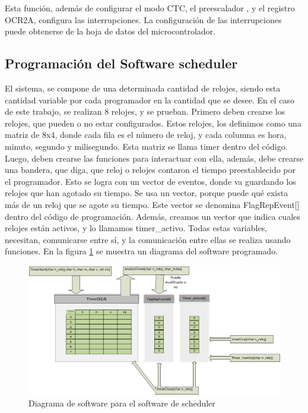 Esta función, además de configurar el modo CTC, el preescalador , y el registro OCR2A, configura las interrupciones. La configuración de las interrupciones puede obtenerse de la hoja de datos del microcontrolador.

\subsection{Programación del Software scheduler} 

El sistema, se compone de una determinada cantidad de relojes, siendo esta cantidad variable por cada programador en la cantidad que se desee. En el caso de este trabajo, se realizan 8 relojes, y se prueban.
Primero deben crearse los relojes, que pueden o no estar configurados. Estos relojes, los definimos como una matriz de 8x4, donde cada fila es el número de reloj, y cada columna es hora, minuto, segundo y milisegundo. Esta matriz se llama timer dentro del código. Luego, deben crearse las funciones para interactuar con ella, además,  debe crearse una bandera, que diga, que reloj o relojes contaron el tiempo preestablecido por el programador. Esto se logra con un vector de eventos, donde va guardando los relojes que han agotado su tiempo. Se usa un vector, porque puede qué exista más de un reloj que se agote su tiempo. Este vector se denomina FlagRepEvent[] dentro del código de programación. Además, creamos un vector que indica cuales relojes están activos, y lo llamamos timer\_activo. Todas estas variables, necesitan, comunicarse entre sí, y la comunicación entre ellas se realiza usando funciones. En la figura \ref{fig:soft_sch} se muestra un diagrama del software programado.  


\begin{figure}[ht]
	\includegraphics[width=\linewidth]{software_timer} 
	\caption{Diagrama de software para el software de scheduler}
	\label{fig:soft_sch} 	
\end{figure}

